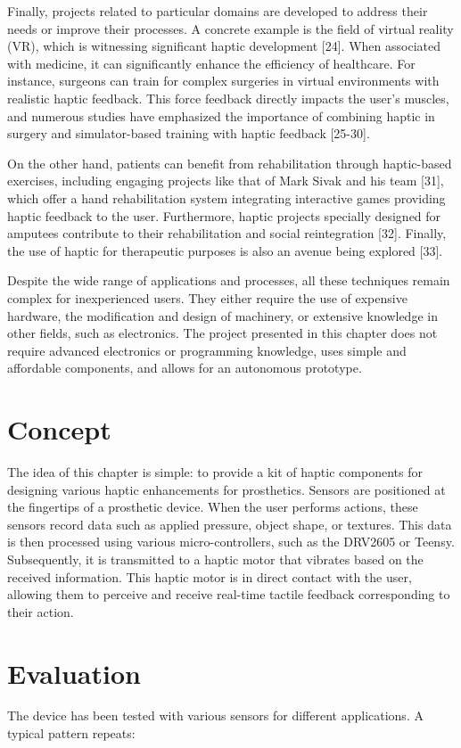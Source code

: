 Finally, projects related to particular domains are developed to address their needs or improve their processes. A concrete example is the field of virtual reality (VR), which is witnessing significant haptic development [24]. When associated with medicine, it can significantly enhance the efficiency of healthcare. For instance, surgeons can train for complex surgeries in virtual environments with realistic haptic feedback. This force feedback directly impacts the user's muscles, and numerous studies have emphasized the importance of combining haptic in surgery and simulator-based training with haptic feedback [25-30].

On the other hand, patients can benefit from rehabilitation through haptic-based exercises, including engaging projects like that of Mark Sivak and his team [31], which offer a hand rehabilitation system integrating interactive games providing haptic feedback to the user. Furthermore, haptic projects specially designed for amputees contribute to their rehabilitation and social reintegration [32]. Finally, the use of haptic for therapeutic purposes is also an avenue being explored [33].

Despite the wide range of applications and processes, all these techniques remain complex for inexperienced users. They either require the use of expensive hardware, the modification and design of machinery, or extensive knowledge in other fields, such as electronics. The project presented in this chapter does not require advanced electronics or programming knowledge, uses simple and affordable components, and allows for an autonomous prototype.

\section{Concept}
The idea of this chapter is simple: to provide a kit of haptic components for designing various haptic enhancements for prosthetics. Sensors are positioned at the fingertips of a prosthetic device. When the user performs actions, these sensors record data such as applied pressure, object shape, or textures. This data is then processed using various micro-controllers, such as the DRV2605 or Teensy. Subsequently, it is transmitted to a haptic motor that vibrates based on the received information. This haptic motor is in direct contact with the user, allowing them to perceive and receive real-time tactile feedback corresponding to their action.

\section{Evaluation}
The device has been tested with various sensors for different applications. A typical pattern repeats: 

